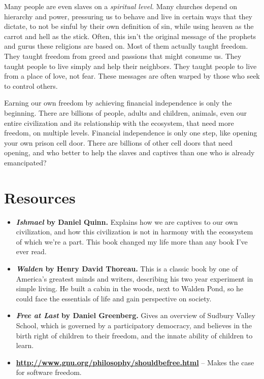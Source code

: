 Many people are even slaves on a \emph{spiritual level.} Many churches depend on hierarchy and power, pressuring us to behave and live in certain ways that they dictate, to not be sinful by their own definition of sin, while using heaven as the carrot and hell as the stick. Often, this isn't the original message of the prophets and gurus these religions are based on. Most of them actually taught freedom. They taught freedom from greed and passions that might consume us. They taught people to live simply and help their neighbors. They taught people to live from a place of love, not fear. These messages are often warped by those who seek to control others.

Earning our own freedom by achieving financial independence is only the beginning. There are billions of people, adults and children, animals, even our entire civilization and its relationship with the ecosystem, that need more freedom, on multiple levels. Financial independence is only one step, like opening your own prison cell door. There are billions of other cell doors that need opening, and who better to help the slaves and captives than one who is already emancipated?

\newpage
\section{Resources}
\begin{itemize}
\item \textbf{\emph{Ishmael} by Daniel Quinn.} Explains how we are captives to our own civilization, and how this civilization is not in harmony with the ecossystem of which we're a part. This book changed my life more than any book I've ever read.

\item \textbf{\emph{Walden} by Henry David Thoreau.} This is a classic book by one of America's greatest minds and writers, describing his two year experiment in simple living. He built a cabin in the woods, next to Walden Pond, so he could face the essentials of life and gain perspective on society.

\item \textbf{\emph{Free at Last} by Daniel Greenberg.} Gives an overview of Sudbury Valley School, which is governed by a participatory democracy, and believes in the birth right of children to their freedom, and the innate ability of children to learn.

\item \textbf{\url{http://www.gnu.org/philosophy/shouldbefree.html}} -- Makes the case for software freedom.
\end{itemize}
